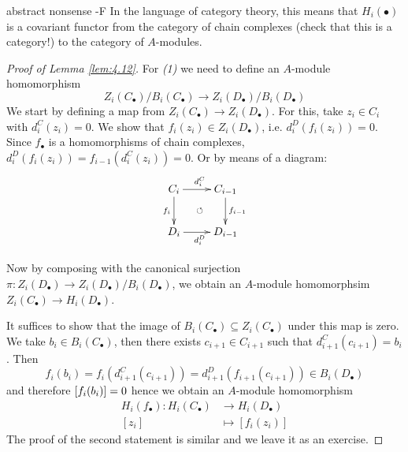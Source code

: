 \documentclass[twoside = false,	%
		headsepline,		%
		parskip = true,
		]{scrbook}						%
\begin{document}
        \begin{remark*}{abstract nonsense -F}
            In the language of category theory, this means that $H_i(\bullet)$ is a covariant functor from the category of chain complexes (check that this is a category!) to the category of $A$-modules.
        \end{remark*}

        \begin{proof}[Proof of Lemma \ref{lem:4.12}]
            For \textit{(1)} we need to define an $A$-module homomorphism
            \begin{equation*}
                Z_i(C_\bullet)/B_i(C_\bullet) \to Z_i(D_\bullet)/B_i(D_\bullet)
            \end{equation*}
            We start by defining a map from $Z_i(C_\bullet) \to Z_i(D_\bullet)$. For this, take $z_i \in C_i$ with $d_i^C(z_i) = 0$. We show that $f_i(z_i) \in Z_i(D_\bullet)$, i.e. $d_i^D(f_i(z_i)) = 0$. Since $f_\bullet$ is a homomorphisms of chain complexes, $d_i^D(f_i(z_i)) = f_{i-1}(d_i^C(z_i)) = 0$. Or by means of a diagram:
            \begin{equation*}
            \xymatrix {
                C_i \ar[r]^{d_i^C} \ar[d]_{f_i} & C_{i-1} \ar[d]^{f_{i-1}}\\
                D_i \ar[r]_{d_{i}^D} \ar@{}[ur]|{\circlearrowleft} & D_{i-1}
            }
            \end{equation*}

            Now by composing with the canonical surjection $\pi: Z_i(D_\bullet) \to Z_i(D_\bullet)/B_i(D_\bullet)$, we obtain an $A$-module homomorphsim $Z_i(C_\bullet) \to H_i(D_\bullet)$.

            It suffices to show that the image of $B_i(C_\bullet) \subseteq Z_i(C_\bullet)$ under this map is zero. We take $b_i \in B_i(C_\bullet)$, then there exists $c_{i+1} \in C_{i+1}$ such that $d_{i+1}^C(c_{i+1}) = b_i$. Then
            \begin{equation*}
                f_i(b_i) = f_i(d_{i+1}^C(c_{i+1})) = d_{i+1}^D(f_{i+1}(c_{i+1})) \in B_i(D_\bullet)
            \end{equation*} and therefore $\left[ f_i(b_i)\right] = 0$ hence we obtain an $A$-module homomorphism
            \begin{equation*}
            \begin{split}
                H_i(f_\bullet): H_i(C_\bullet) &\to H_i(D_\bullet) \\ [z_i] &\mapsto [f_i(z_i)] 
            \end{split}
            \end{equation*}
            The proof of the second statement is similar and we leave it as an exercise. 
        \end{proof}
\end{document}
